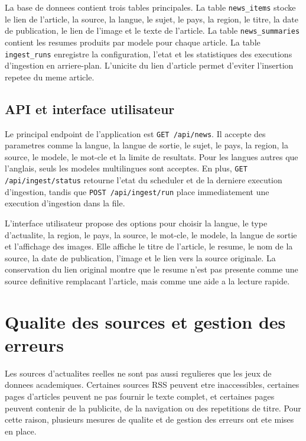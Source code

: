 La base de donnees contient trois tables principales. La table \texttt{news\_items} stocke le lien de l'article, la source, la langue, le sujet, le pays, la region, le titre, la date de publication, le lien de l'image et le texte de l'article. La table \texttt{news\_summaries} contient les resumes produits par modele pour chaque article. La table \texttt{ingest\_runs} enregistre la configuration, l'etat et les statistiques des executions d'ingestion en arriere-plan. L'unicite du lien d'article permet d'eviter l'insertion repetee du meme article.

\subsection{API et interface utilisateur}

Le principal endpoint de l'application est \texttt{GET /api/news}. Il accepte des parametres comme la langue, la langue de sortie, le sujet, le pays, la region, la source, le modele, le mot-cle et la limite de resultats. Pour les langues autres que l'anglais, seuls les modeles multilingues sont acceptes. En plus, \texttt{GET /api/ingest/status} retourne l'etat du scheduler et de la derniere execution d'ingestion, tandis que \texttt{POST /api/ingest/run} place immediatement une execution d'ingestion dans la file.

L'interface utilisateur propose des options pour choisir la langue, le type d'actualite, la region, le pays, la source, le mot-cle, le modele, la langue de sortie et l'affichage des images. Elle affiche le titre de l'article, le resume, le nom de la source, la date de publication, l'image et le lien vers la source originale. La conservation du lien original montre que le resume n'est pas presente comme une source definitive remplacant l'article, mais comme une aide a la lecture rapide.

\section{Qualite des sources et gestion des erreurs}

Les sources d'actualites reelles ne sont pas aussi regulieres que les jeux de donnees academiques. Certaines sources RSS peuvent etre inaccessibles, certaines pages d'articles peuvent ne pas fournir le texte complet, et certaines pages peuvent contenir de la publicite, de la navigation ou des repetitions de titre. Pour cette raison, plusieurs mesures de qualite et de gestion des erreurs ont ete mises en place.

